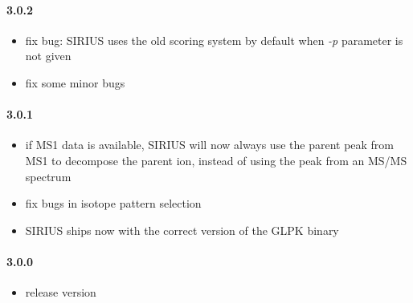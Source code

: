 \paragraph{3.0.2}

\begin{itemize}

\item
  fix bug: SIRIUS uses the old scoring system by default when \emph{-p}
  parameter is not given
\item
  fix some minor bugs
\end{itemize}

\paragraph{3.0.1}

\begin{itemize}

\item
  if MS1 data is available, SIRIUS will now always use the parent peak
  from MS1 to decompose the parent ion, instead of using the peak from
  an MS/MS spectrum
\item
  fix bugs in isotope pattern selection
\item
  SIRIUS ships now with the correct version of the GLPK binary
\end{itemize}

\paragraph{3.0.0}

\begin{itemize}
\item
  release version
\end{itemize}

